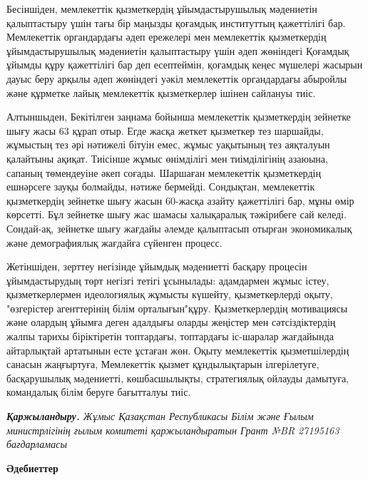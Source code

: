 \begin{multicols}{2}
Бесіншіден, мемлекеттік қызметкердің ұйымдастырушылық мәдениетін
қалыптастыру үшін тағы бір маңызды қоғамдық институттың қажеттілігі бар.
Мемлекеттік органдардағы әдеп ережелері мен мемлекеттік қызметкердің
ұйымдастырушылық мәдениетін қалыптастыру үшін әдеп жөніндегі Қоғамдық
ұйымды құру қажеттілігі бар деп есептеймін, қоғамдық кеңес мүшелері
жасырын дауыс беру арқылы әдеп жөніндегі уәкіл мемлекеттік органдардағы
абыройлы және құрметке лайық мемлекеттік қызметкерлер ішінен сайлануы
тиіс.

Алтыншыден, Бекітілген заңнама бойынша мемлекеттік қызметкердің зейнетке
шығу жасы 63 құрап отыр. Егде жасқа жеткет қызметкер тез шаршайды,
жұмыстың тез әрі нәтижелі бітуін емес, жұмыс уақытының тез аяқталуын
қалайтыны ақиқат. Тиісінше жұмыс өнімділігі мен тиімділігінің азаюына,
сапаның төмендеуіне әкеп соғады. Шаршаған мемлекеттік қызметкердің
ешнәрсеге зауқы болмайды, нәтиже бермейді. Сондықтан, мемлекеттік
қызметкердің зейнетке шығу жасын 60-жасқа азайту қажеттілігі бар, мұны
өмір көрсетті. Бұл зейнетке шығу жас шамасы халықаралық тәжірибеге сай
келеді. Сондай-ақ, зейнетке шығу жағдайы әлемде қалыптасып отырған
экономикалық және демографиялық жағдайға сүйенген процесс.

Жетіншіден, зерттеу негізінде ұйымдық мәдениетті басқару процесін
ұйымдастырудың төрт негізгі тетігі ұсынылады: адамдармен жұмыс істеу,
қызметкерлермен идеологиялық жұмысты күшейту, қызметкерлерді оқыту,
"өзгерістер агенттерінің білім орталығын"құру. Қызметкерлердің
мотивациясы және олардың ұйымға деген адалдығы оларды жеңістер мен
сәтсіздіктердің жалпы тарихы біріктіретін топтардағы, топтардағы
іс-шаралар жағдайында айтарлықтай артатынын есте ұстаған жөн. Оқыту
мемлекеттік қызметшілердің санасын жаңғыртуға, Мемлекеттік қызмет
құндылықтарын ілгерілетуге, басқарушылық мәдениетті, көшбасшылықты,
стратегиялық ойлауды дамытуға, командалық білім беруге бағытталуы тиіс.

\emph{{\bfseries Қаржыландыру.} Жұмыс Қазақстан Республикасы Білім және
Ғылым министрлігінің ғылым комитеті қаржыландыратын Грант №BR 27195163
бағдарламасы}
\end{multicols}

\begin{center}
{\bfseries Әдебиеттер}
\end{center}

